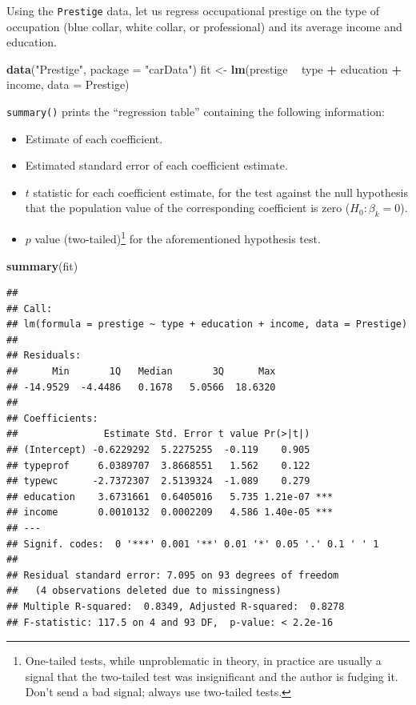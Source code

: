 \documentclass[12pt,oneside,openany]{book}
\newenvironment{Shaded}{\begin{snugshade}}{\end{snugshade}}
\newcommand{\KeywordTok}[1]{\textcolor[rgb]{0.13,0.29,0.53}{\textbf{#1}}}
\newcommand{\DataTypeTok}[1]{\textcolor[rgb]{0.13,0.29,0.53}{#1}}
\newcommand{\StringTok}[1]{\textcolor[rgb]{0.31,0.60,0.02}{#1}}
\newcommand{\OperatorTok}[1]{\textcolor[rgb]{0.81,0.36,0.00}{\textbf{#1}}}
\newcommand{\NormalTok}[1]{#1}
\providecommand{\tightlist}{%
  \setlength{\itemsep}{0pt}\setlength{\parskip}{0pt}}
\begin{document}
Using the \texttt{Prestige} data, let us regress occupational prestige
on the type of occupation (blue collar, white collar, or professional)
and its average income and education.

\begin{Shaded}
\begin{Highlighting}[]
\KeywordTok{data}\NormalTok{(}\StringTok{"Prestige"}\NormalTok{, }\DataTypeTok{package =} \StringTok{"carData"}\NormalTok{)}
\NormalTok{fit <-}\StringTok{ }\KeywordTok{lm}\NormalTok{(prestige }\OperatorTok{~}\StringTok{ }\NormalTok{type }\OperatorTok{+}\StringTok{ }\NormalTok{education }\OperatorTok{+}\StringTok{ }\NormalTok{income, }\DataTypeTok{data =}\NormalTok{ Prestige)}
\end{Highlighting}
\end{Shaded}

\texttt{summary()} prints the ``regression table'' containing the
following information:

\begin{itemize}
\tightlist
\item
  Estimate of each coefficient.
\item
  Estimated standard error of each coefficient estimate.
\item
  \(t\) statistic for each coefficient estimate, for the test against
  the null hypothesis that the population value of the corresponding
  coefficient is zero (\(H_0 : \beta_k = 0\)).
\item
  \(p\) value (two-tailed)\footnote{One-tailed tests, while
    unproblematic in theory, in practice are usually a signal that the
    two-tailed test was insignificant and the author is fudging it.
    Don't send a bad signal; always use two-tailed tests.} for the
  aforementioned hypothesis test.
\end{itemize}

\begin{Shaded}
\begin{Highlighting}[]
\KeywordTok{summary}\NormalTok{(fit)}
\end{Highlighting}
\end{Shaded}

\begin{verbatim}
## 
## Call:
## lm(formula = prestige ~ type + education + income, data = Prestige)
## 
## Residuals:
##      Min       1Q   Median       3Q      Max 
## -14.9529  -4.4486   0.1678   5.0566  18.6320 
## 
## Coefficients:
##               Estimate Std. Error t value Pr(>|t|)    
## (Intercept) -0.6229292  5.2275255  -0.119    0.905    
## typeprof     6.0389707  3.8668551   1.562    0.122    
## typewc      -2.7372307  2.5139324  -1.089    0.279    
## education    3.6731661  0.6405016   5.735 1.21e-07 ***
## income       0.0010132  0.0002209   4.586 1.40e-05 ***
## ---
## Signif. codes:  0 '***' 0.001 '**' 0.01 '*' 0.05 '.' 0.1 ' ' 1
## 
## Residual standard error: 7.095 on 93 degrees of freedom
##   (4 observations deleted due to missingness)
## Multiple R-squared:  0.8349, Adjusted R-squared:  0.8278 
## F-statistic: 117.5 on 4 and 93 DF,  p-value: < 2.2e-16
\end{verbatim}
\end{document}
